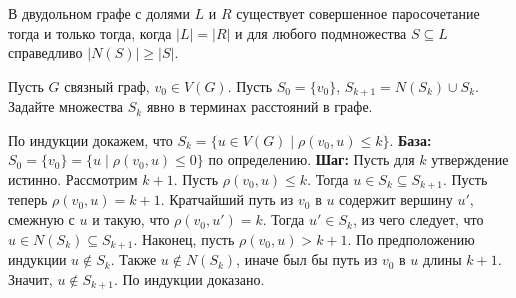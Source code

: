 \begin{theorem}
    В двудольном графе с долями $ L $ и $ R $ существует совершенное паросочетание тогда и только тогда,
    когда $ |L| = |R| $ и для любого подмножества $ S \subseteq L $ справедливо $ |N(S)| \geqslant |S| $.
\end{theorem}

\begin{Exercise}[counter=SecExercise, label={exercise:almost_BFS}]
    \noindent
    Пусть $ G $ связный граф, $ v_0 \in V(G) $.
    Пусть $ S_0 = \{ v_0 \} $, $ S_{k+1} = N(S_k) \cup S_k $.
    Задайте множества $ S_k $ явно в терминах расстояний в графе.
\end{Exercise}

\begin{Answer}
    \noindent

    По индукции докажем, что $ S_k = \{ u \in V(G) \mid \rho(v_0, u) \leqslant k \} $.
    \newline
    \textbf{База:}
    $ S_0 = \{ v_0 \} = \{ u \mid \rho(v_0, u) \leqslant 0 \} $ по определению.
    \newline
    \textbf{Шаг:}
    Пусть для $ k $ утверждение истинно.
    Рассмотрим $ k + 1 $.
    Пусть $ \rho(v_0, u) \leqslant k $.
    Тогда $ u \in S_k \subseteq S_{k+1} $.
    Пусть теперь $ \rho(v_0, u) = k + 1 $.
    Кратчайший путь из $ v_0 $ в $ u $ содержит вершину $ u' $, смежную с $ u $ и такую, что $ \rho(v_0, u') = k $.
    Тогда $ u' \in S_k $, из чего следует, что $ u \in N(S_k) \subseteq S_{k+1} $.
    Наконец, пусть $ \rho(v_0, u) > k + 1 $.
    По предположению индукции $ u \notin S_k $.
    Также $ u \notin N(S_k) $, иначе был бы путь из $ v_0 $ в $ u $ длины $ k + 1 $.
    Значит, $ u \notin S_{k+1} $.
    \newline
    По индукции доказано.

\end{Answer}

